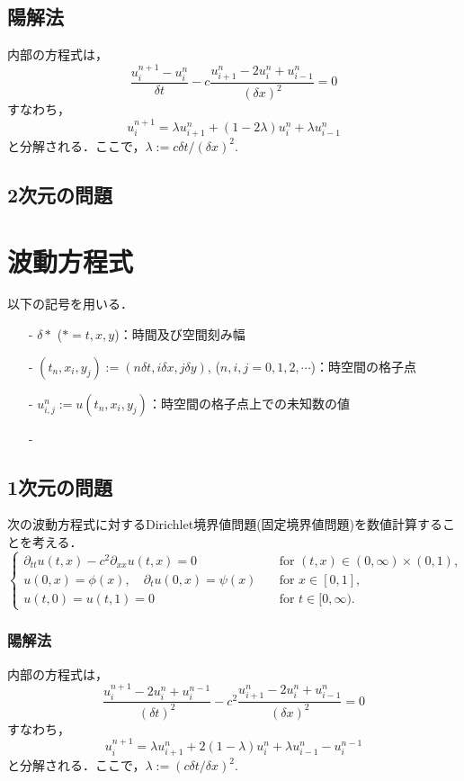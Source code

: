 \subsection{陽解法}
内部の方程式は，
$$
\frac{u^{n+1}_{i}-u^{n}_{i}}{\delta t}-c\frac{u^{n}_{i+1}-2u^{n}_{i}+u^{n}_{i-1}}{(\delta x)^{2}}=0
$$
すなわち，
$$
u^{n+1}_{i}=\lambda u^{n}_{i+1}+(1-2\lambda)u^{n}_{i}+\lambda u^{n}_{i-1}
$$
と分解される．ここで，$\lambda:=c\delta t/(\delta x)^{2}$.


\subsection{ 2次元の問題}



\section{波動方程式}
以下の記号を用いる．
\begin{itemize}
\item[-] $\delta \ast$ ($\ast=t,x,y$)：時間及び空間刻み幅
\item[-] $(t_n ,x_i ,y_j):=(n \delta t,i \delta x,j \delta y)$, ($n,i,j=0,1,2,\cdots$)：時空間の格子点
\item[-] $u^{n}_{i,j}:=u(t_n, x_i, y_j)$：時空間の格子点上での未知数の値
\item[-]  
\end{itemize}

\subsection{ 1次元の問題}
次の波動方程式に対するDirichlet境界値問題(固定境界値問題)を数値計算することを考える．
\begin{equation}
\label{e:wave1d}
	\begin{cases}
		\partial_{tt}u(t,x)-c^{2}\partial_{xx}u(t,x)=0\quad&\text{for $(t,x)\in(0,\infty)\times(0,1)$,}\\
		u(0,x)=\phi(x),\quad \partial_{t}u(0,x)=\psi(x)\quad&\text{for $x\in[0,1]$,}\\
		u(t,0)=u(t,1)=0\quad&\text{for $t\in[0,\infty)$.}
	\end{cases}
\end{equation}

\subsubsection{陽解法}
内部の方程式は，
$$
\frac{u^{n+1}_{i}-2u^{n}_{i}+u^{n-1}_{i}}{(\delta t)^{2}}-c^{2}\frac{u^{n}_{i+1}-2u^{n}_{i}+u^{n}_{i-1}}{(\delta x)^{2}}=0
$$
すなわち，
$$
u^{n+1}_{i}=\lambda u^{n}_{i+1}+2(1-\lambda)u^{n}_{i}+\lambda u^{n}_{i-1}-u^{n-1}_{i}
$$
と分解される．ここで，$\lambda:=(c\delta t/\delta x)^{2}$.

